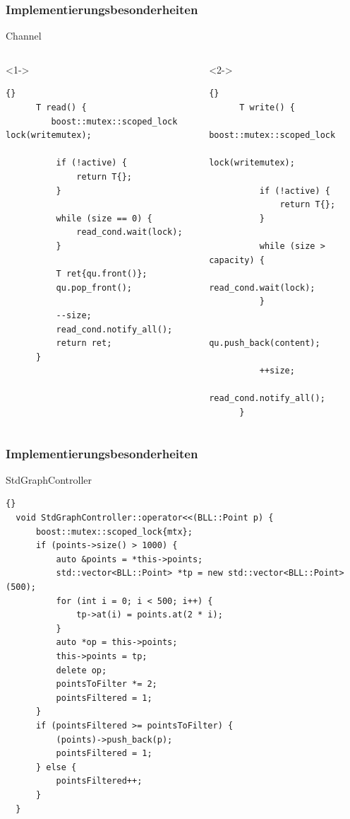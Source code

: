 \documentclass{beamer}
\begin{document}
\begin{frame}[fragile]
\frametitle{Implementierungsbesonderheiten}
\begin{block}{Channel}
\begin{columns}
  \begin{column}{0.5\textwidth}<1->
    \begin{lstlisting}{}
      T read() {
         boost::mutex::scoped_lock lock(writemutex);
 
          if (!active) {
              return T{};
          }
 
          while (size == 0) {
              read_cond.wait(lock);
          }
 
          T ret{qu.front()};
          qu.pop_front();
 
          --size;
          read_cond.notify_all();
          return ret;
      }
    \end{lstlisting}
  \end{column}
  \begin{column}{0.5\textwidth}<2->
   \begin{lstlisting}{}
      T write() {
          boost::mutex::scoped_lock 
                lock(writemutex);
 
          if (!active) {
              return T{};
          }
 
          while (size > capacity) {
             read_cond.wait(lock);
          }
 
          qu.push_back(content);

          ++size;
          read_cond.notify_all();         
      }
   \end{lstlisting}
  \end{column}
\end{columns}
\end{block}
\end{frame}


\begin{frame}[fragile]
\frametitle{Implementierungsbesonderheiten}
\begin{block}{StdGraphController}
  \begin{lstlisting}{}
  void StdGraphController::operator<<(BLL::Point p) {
      boost::mutex::scoped_lock{mtx};
      if (points->size() > 1000) {
          auto &points = *this->points;
          std::vector<BLL::Point> *tp = new std::vector<BLL::Point>(500);
          for (int i = 0; i < 500; i++) {
              tp->at(i) = points.at(2 * i);
          }
          auto *op = this->points;
          this->points = tp;
          delete op;
          pointsToFilter *= 2;
          pointsFiltered = 1;
      }
      if (pointsFiltered >= pointsToFilter) {
          (points)->push_back(p);
          pointsFiltered = 1;
      } else {
          pointsFiltered++;
      }
  }
  \end{lstlisting}
\end{block}
\end{frame}
\end{document}
